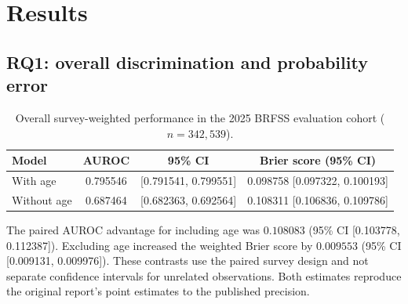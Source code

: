 \section{Results}
\subsection{RQ1: overall discrimination and probability error}
\begin{table}[htbp]\centering\caption{Overall survey-weighted performance in the 2025 BRFSS evaluation cohort ($n=342{,}539$).}\small
\begin{tabular}{lccc}\toprule
Model & AUROC & 95\% CI & Brier score (95\% CI) \\\midrule
With age & 0.795546 & [0.791541, 0.799551] & 0.098758 [0.097322, 0.100193] \\
Without age & 0.687464 & [0.682363, 0.692564] & 0.108311 [0.106836, 0.109786] \\\bottomrule
\end{tabular}\end{table}
The paired AUROC advantage for including age was $0.108083$ (95\% CI [0.103778, 0.112387]). Excluding age increased the weighted Brier score by $0.009553$ (95\% CI [0.009131, 0.009976]). These contrasts use the paired survey design and not separate confidence intervals for unrelated observations. Both estimates reproduce the original report's point estimates to the published precision.

